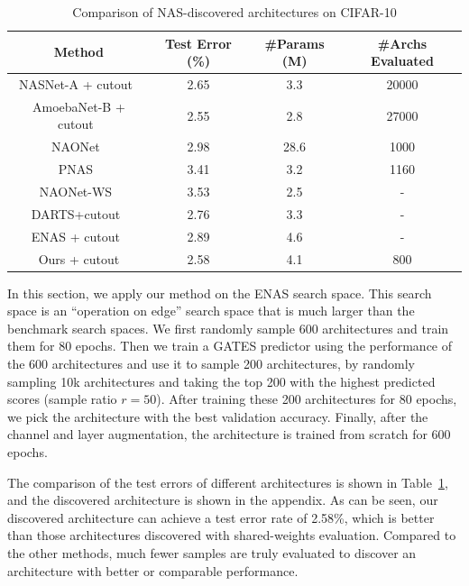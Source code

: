 \documentclass[runningheads]{llncs}
\begin{document}
\addtolength{\tabcolsep}{1pt}
\begin{table}[tb]
  \caption{Comparison of NAS-discovered architectures on CIFAR-10}
  \label{table:nas-enas}
  \vspace{-15pt}
  \begin{center}
    \begin{tabular}{cccc}
      \toprule
      Method & Test Error (\%) & \#Params (M) & \#Archs Evaluated\\\midrule
      NASNet-A + cutout~\cite{zoph2016neural}         & 2.65 & 3.3   & 20000 \\
      AmoebaNet-B + cutout~\cite{real2019regularized} & 2.55 & 2.8   & 27000 \\
      NAONet~\cite{nao2018}                           & 2.98 & 28.6  & 1000  \\
      PNAS~\cite{liu2018progressive}                  & 3.41 & 3.2   & 1160  \\\cmidrule(lr){1-4}
      NAONet-WS~\cite{nao2018}                        & 3.53 & 2.5   & -     \\
      DARTS+cutout~\cite{darts}                       & 2.76 & 3.3   & -     \\
      ENAS + cutout~\cite{pham2018efficient}          & 2.89 & 4.6   & -     \\ \hline
      Ours + cutout                                   & 2.58 & 4.1  & 800   \\ \bottomrule
    \end{tabular}
  \end{center}
\end{table}
\addtolength{\tabcolsep}{-1pt}

In this section, we apply our method on the ENAS search space. This search space is an ``operation on edge'' search space that is much larger than the benchmark search spaces. We first randomly sample 600 architectures and train them for 80 epochs.
Then we train a GATES predictor using the performance of the 600 architectures and use it
to sample 200 architectures, by randomly sampling 10k architectures and taking the top 200
with the highest predicted scores (sample ratio $r=50$). After training these 200 architectures for 80 epochs, we pick the architecture with the best validation accuracy. Finally, after the channel and layer augmentation, the architecture is trained from scratch for 600 epochs.

The comparison of the test errors of different architectures is shown in Table~\ref{table:nas-enas}, and the discovered architecture is shown in the appendix. As can be seen, our discovered architecture can achieve a
test error rate of 2.58\%, which is better than those architectures discovered with shared-weights evaluation. Compared to the other methods, much fewer samples are truly evaluated to discover an architecture with better or comparable performance.
\end{document}
